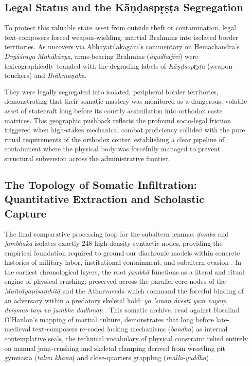 \documentclass[11pt,twoside,letterpaper]{article}
\begin{document}
\subsection{Legal Status and the Kāṇḍaspr̥ṣṭa Segregation}
To protect this valuable state asset from outside theft or contamination, legal text-composers forced weapon-wielding, martial Brahmins into isolated border territories. As \citet{Sandesara1948} uncovers via Abhayatilakagaṇi’s commentary on Hemachandra’s \textit{Dvyāśraya Mahākāvya}, arms-bearing Brahmins (\textit{āyudhajīvī}) were lexicographically branded with the degrading labels of \textit{Kāṇḍaspr̥ṣṭa} (weapon-touchers) and \textit{Brāhmaṇaka}. 

They were legally segregated into isolated, peripheral border territories, demonstrating that their somatic mastery was monitored as a dangerous, volatile asset of statecraft long before its courtly assimilation into orthodox caste matrices. This geographic pushback reflects the profound socio-legal friction triggered when high-stakes mechanical combat proficiency collided with the pure ritual requirements of the orthodox center, establishing a clear pipeline of containment where the physical body was forcefully managed to prevent structural subversion across the administrative frontier.

\subsection{The Topology of Somatic Infiltration: Quantitative Extraction and Scholastic Capture}
The final comparative processing loop for the subaltern lemmas \textit{ḍomba} and \textit{jambhaka} isolates exactly 248 high-density syntactic nodes, providing the empirical foundation required to ground our diachronic models within concrete histories of military labor, institutional containment, and subaltern evasion \citep{Lorenzen1978, McCartneyForthcomingA}. In the earliest chronological layers, the root \textit{jambhā} functions as a literal and ritual engine of physical crushing, preserved across the parallel core nodes of the \textit{Maitrāyaṇīsaṃhitā} and the Atharvaveda which command the forceful binding of an adversary within a predatory skeletal hold: \textit{yo ’smān dveṣṭi yaṃ vayaṃ dviṣmas taṃ vo jambhe dadhmaḥ} \citep{McCartneyForthcomingB}. This somatic archive, read against Rosalind O’Hanlon’s mapping of martial culture, demonstrates that long before late-medieval text-composers re-coded locking mechanisms (\textit{bandha}) as internal contemplative seals, the technical vocabulary of physical constraint relied entirely on manual joint-crushing and skeletal clamping derived from wrestling pit gymnasia (\textit{tālīm khānā}) and close-quarters grappling (\textit{malla-yuddha}) \citep{Birch2024, OHanlon2007}.
\end{document}
